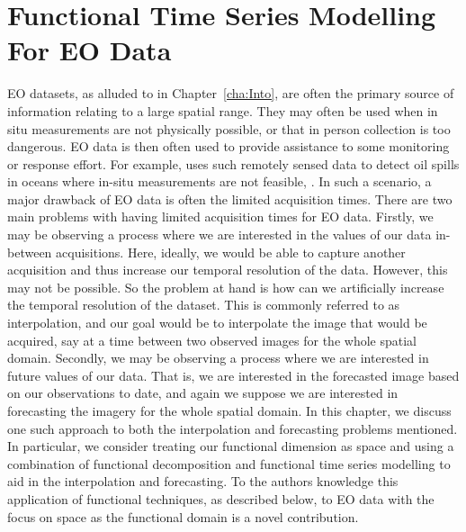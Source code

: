 
\chapter{Functional Time Series Modelling For EO Data \label{cha:ftsm}}  %


\ifpdf
    \graphicspath{{Chapter4/Figs/Raster/}{Chapter4/Figs/PDF/}{Chapter4/Figs/}}
\else
    \graphicspath{{Chapter4/Figs/Vector/}{Chapter4/Figs/}}
\fi

EO datasets, as alluded to in Chapter~\ref{cha:Into}, are often the primary source of information relating to a large spatial range.
They may often be used when in situ measurements are not physically possible, or that in person collection is too dangerous.
EO data is then often used to provide assistance to some monitoring or response effort.
For example, \citeauthor{singha_satellite_2013} uses such remotely sensed data to detect oil spills in oceans where in-situ measurements are not feasible, \citep{singha_satellite_2013}.
In such a scenario, a major drawback of EO data is often the limited acquisition times.
There are two main problems with having limited acquisition times for EO data.
Firstly, we may be observing a process where we are interested in the values of our data in-between acquisitions.
Here, ideally, we would be able to capture another acquisition and thus increase our temporal resolution of the data.
However, this may not be possible.
So the problem at hand is how can we artificially increase the temporal resolution of the dataset.
This is commonly referred to as interpolation, and our goal would be to interpolate the image that would be acquired, say at a time between two observed images for the whole spatial domain.
Secondly, we may be observing a process where we are interested in future values of our data. That is, we are interested in the forecasted image based on our observations to date, and again we suppose we are interested in forecasting the imagery for the whole spatial domain.
In this chapter, we discuss one such approach to both the interpolation and forecasting problems mentioned. In particular, we consider treating our functional dimension as space and using a combination of functional decomposition and functional time series modelling to aid in the interpolation and forecasting. To the authors knowledge this application of functional techniques, as described below, to EO data with the focus on space as the functional domain  is a novel contribution. 

